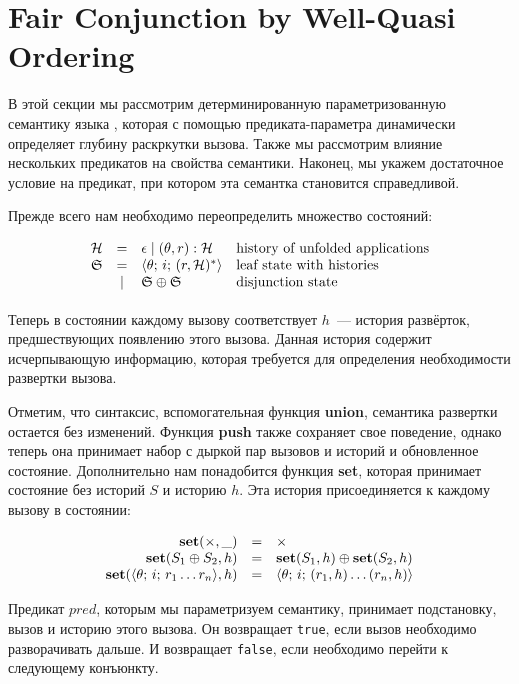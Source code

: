 \section{Fair Conjunction by Well-Quasi Ordering}
\label{sec:fair-semantics}

В этой секции мы рассмотрим детерминированную параметризованную семантику языка \mk, которая с помощью предиката-параметра динамически определяет
глубину раскркутки вызова. Также мы рассмотрим влияние нескольких предикатов на свойства семантики. Наконец, мы укажем достаточное условие на предикат,
при котором эта семантка становится справедливой.

Прежде всего нам необходимо переопределить множество состояний:

\[
\begin{array}{rcll}
\mathcal{H} & = & \epsilon \mid (\theta, r) : \mathcal{H} & \mbox{history of unfolded applications}\\
\mathfrak{S} & = & \langle \theta;\, i;\, (r, \mathcal{H})^* \rangle & \mbox{leaf state with histories}\\
             & \mid &\mathfrak{S} \oplus \mathfrak{S} & \mbox{disjunction state} \\[1mm]
\end{array}
\]

\noindent Теперь в состоянии каждому вызову соответствует $h$~--- история развёрток, предшествующих появлению этого вызова. Данная история содержит исчерпывающую информацию, которая требуется для определения необходимости развертки вызова.  

Отметим, что синтаксис, вспомогательная функция {\bf union}, семантика развертки остается без изменений. Функция {\bf push} также сохраняет свое поведение, однако теперь она принимает набор  с дыркой пар вызовов и историй и обновленное состояние. Дополнительно нам понадобится функция {\bf set}, которая принимает состояние без историй $S$ и историю $h$. Эта история присоединяется к каждому вызову в состоянии:

\[
\begin{array}{rcl}
    \mbox{\bf set}(\times, \_) & = & \times \\
    \mbox{\bf set}(S_1 \oplus S_2, h) & = & \mbox{\bf set}(S_1, h) \oplus \mbox{\bf set}(S_2, h) \\
    \mbox{\bf set}(\langle \theta;\, i;\, r_1\ldots r_n \rangle, h) & = & \langle \theta;\, i;\, (r_1, h) \ldots (r_n, h) \rangle 
\end{array}
\]

Предикат $pred$, которым мы параметризуем семантику, принимает подстановку, вызов и историю этого вызова. Он возвращает \lstinline|true|, если вызов необходимо разворачивать дальше. И возвращает \lstinline|false|, если необходимо перейти к следующему конъюнкту.

